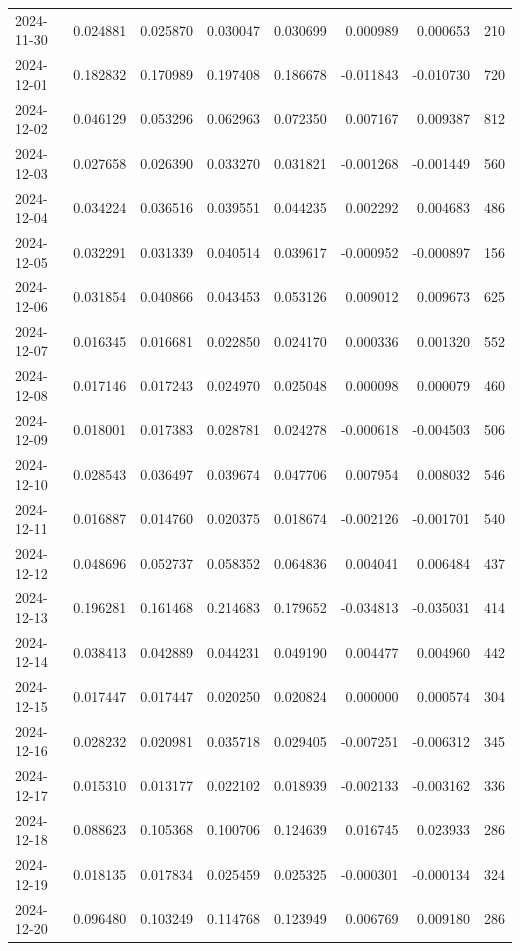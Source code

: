 \begin{tabular}{lrrrrrrr}
2024-11-30 & 0.024881 & 0.025870 & 0.030047 & 0.030699 & 0.000989 & 0.000653 & 210 \\
2024-12-01 & 0.182832 & 0.170989 & 0.197408 & 0.186678 & -0.011843 & -0.010730 & 720 \\
2024-12-02 & 0.046129 & 0.053296 & 0.062963 & 0.072350 & 0.007167 & 0.009387 & 812 \\
2024-12-03 & 0.027658 & 0.026390 & 0.033270 & 0.031821 & -0.001268 & -0.001449 & 560 \\
2024-12-04 & 0.034224 & 0.036516 & 0.039551 & 0.044235 & 0.002292 & 0.004683 & 486 \\
2024-12-05 & 0.032291 & 0.031339 & 0.040514 & 0.039617 & -0.000952 & -0.000897 & 156 \\
2024-12-06 & 0.031854 & 0.040866 & 0.043453 & 0.053126 & 0.009012 & 0.009673 & 625 \\
2024-12-07 & 0.016345 & 0.016681 & 0.022850 & 0.024170 & 0.000336 & 0.001320 & 552 \\
2024-12-08 & 0.017146 & 0.017243 & 0.024970 & 0.025048 & 0.000098 & 0.000079 & 460 \\
2024-12-09 & 0.018001 & 0.017383 & 0.028781 & 0.024278 & -0.000618 & -0.004503 & 506 \\
2024-12-10 & 0.028543 & 0.036497 & 0.039674 & 0.047706 & 0.007954 & 0.008032 & 546 \\
2024-12-11 & 0.016887 & 0.014760 & 0.020375 & 0.018674 & -0.002126 & -0.001701 & 540 \\
2024-12-12 & 0.048696 & 0.052737 & 0.058352 & 0.064836 & 0.004041 & 0.006484 & 437 \\
2024-12-13 & 0.196281 & 0.161468 & 0.214683 & 0.179652 & -0.034813 & -0.035031 & 414 \\
2024-12-14 & 0.038413 & 0.042889 & 0.044231 & 0.049190 & 0.004477 & 0.004960 & 442 \\
2024-12-15 & 0.017447 & 0.017447 & 0.020250 & 0.020824 & 0.000000 & 0.000574 & 304 \\
2024-12-16 & 0.028232 & 0.020981 & 0.035718 & 0.029405 & -0.007251 & -0.006312 & 345 \\
2024-12-17 & 0.015310 & 0.013177 & 0.022102 & 0.018939 & -0.002133 & -0.003162 & 336 \\
2024-12-18 & 0.088623 & 0.105368 & 0.100706 & 0.124639 & 0.016745 & 0.023933 & 286 \\
2024-12-19 & 0.018135 & 0.017834 & 0.025459 & 0.025325 & -0.000301 & -0.000134 & 324 \\
2024-12-20 & 0.096480 & 0.103249 & 0.114768 & 0.123949 & 0.006769 & 0.009180 & 286 \\

\end{tabular}

